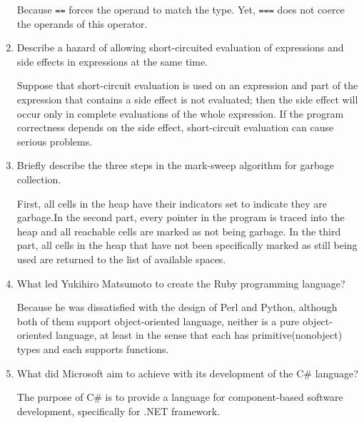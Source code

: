\begin{enumerate}
  \begin{answer}

    Because \verb+==+ forces the operand to match the type. Yet, \verb+===+ does not coerce the operands of this operator. 

    \end{answer}

  \item Describe a hazard of allowing short-circuited evaluation
    of expressions and side effects in expressions at the same time.

  \begin{answer}

   Suppose that short-circuit evaluation is used on an expression and part of the expression that contains a side effect is not evaluated; then the side effect will occur only in complete evaluations of the whole expression. If the program correctness depends on the side effect, short-circuit evaluation can cause serious problems. 

    \end{answer}

  \item Briefly describe the three steps in the mark-sweep algorithm
    for garbage collection.

  \begin{answer}

    First, all cells in the heap have their indicators set to indicate they are garbage.In the second part, every pointer in the program is traced into the heap and all reachable cells are marked as not being garbage. In the third part, all cells in the heap that have not been specifically marked as still being used are returned to the list of available spaces.  

    \end{answer}

  \item What led Yukihiro Matsumoto to create the Ruby programming language?

  \begin{answer}

    Because he was dissatisfied with the design of Perl and Python, although both of them support object-oriented language, neither is a pure object-oriented language, at least in the sense that each has primitive(nonobject) types and each supports functions. 

    \end{answer}

  \item What did Microsoft aim to achieve with its development of the
    C\# language?

  \begin{answer}

    The purpose of C\# is to provide a language for component-based software development, specifically for .NET framework. 

    \end{answer}

  \end{enumerate}



